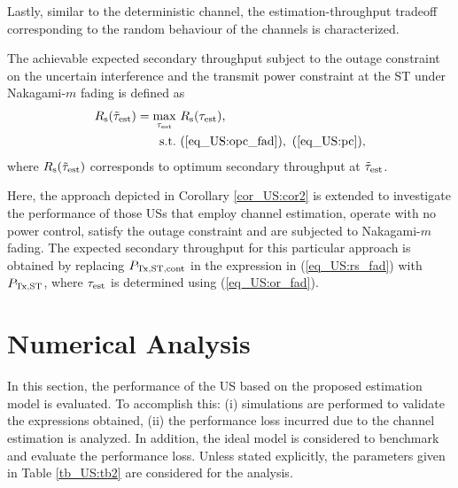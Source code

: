 Lastly, similar to the deterministic channel, the estimation-throughput tradeoff corresponding to the random behaviour of the channels is characterized. 
\begin{theorem} \label{th_US:th2}
\normalfont
The achievable expected secondary throughput subject to the outage constraint on the uncertain interference and the transmit power constraint at the ST under Nakagami-$m$ fading is defined as
\begin{align}
R_{\text{s}}(\tilde{\tau}_{\text{est}}) = \operatorname*{max}_{\tau_{\text{est}}}  & \text{      } {R_{\text{s}}(\tau_{\text{est}})}, 
 \label{eq_US:sys_fad} \\
\text{s.t.} & \text{ } (\ref{eq_US:opc_fad}), \text{  } (\ref{eq_US:pc}), \nonumber 
 \end{align}
where $R_{\text{s}}(\tilde{\tau}_{\text{est}})$ corresponds to optimum secondary throughput at $\tilde{\tau}_{\text{est}}$.  
\end{theorem}

\begin{coro} \label{cor_US:cor3}
\normalfont
Here, the approach depicted in Corollary \ref{cor_US:cor2} is extended to investigate the performance of those USs that employ channel estimation, operate with no power control, satisfy the outage constraint and are subjected to Nakagami-$m$ fading. The expected secondary throughput for this particular approach is obtained by replacing $P_{\text{Tx,ST,cont}}$ in the expression in (\ref{eq_US:rs_fad}) with $P_{\text{Tx,ST}}$, where $\tau_{\text{est}}$ is determined using (\ref{eq_US:or_fad}). 

\end{coro}
 
\section{Numerical Analysis} \label{sec_US:num_ana}
In this section, the performance of the US based on the proposed estimation model is evaluated. To accomplish this: (i) simulations are performed to validate the expressions obtained, (ii) the performance loss incurred due to the channel estimation is analyzed. In addition, the ideal model is considered to benchmark and evaluate the performance loss. %
Unless stated explicitly, the parameters given in Table \ref{tb_US:tb2} are considered for the analysis.%


